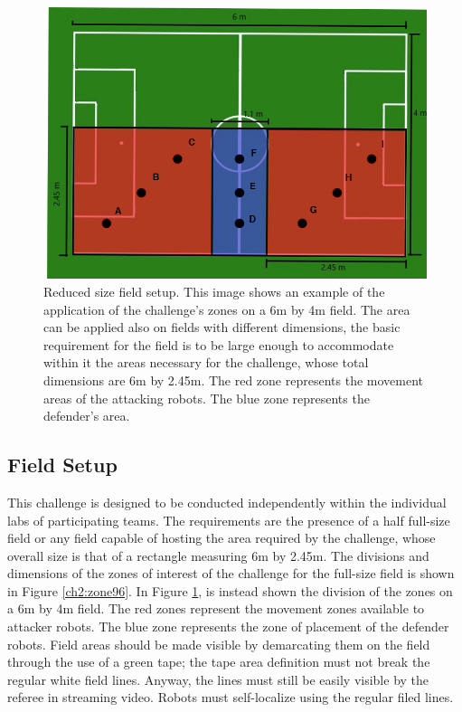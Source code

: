 \begin{figure}[ht]
\includegraphics[width=0.95\linewidth]{figs/ch_2_reduced.jpg}
\caption{Reduced size field setup. This image shows an example of the application of the challenge's zones on a 6m by 4m field. The area can be applied also on fields with different dimensions, the basic requirement for the field is to be large enough to accommodate within it the areas necessary for the challenge, whose total dimensions are 6m by 2.45m. The red zone represents the movement areas of the attacking robots. The blue zone represents the defender's area.}
\label{ch2:zone64}
\centering
\end{figure}


\subsection{Field Setup}
This challenge is designed to be conducted independently within the individual labs of participating teams. The requirements are the presence of a half full-size field or any field capable of hosting the area required by the challenge, whose overall size is that of a rectangle measuring 6m by 2.45m.  
The divisions and dimensions of the zones of interest of the challenge for the full-size field is shown in Figure \ref{ch2:zone96}. In Figure \ref{ch2:zone64}, is instead shown the division of the zones on a 6m by 4m field.
The red zones represent the movement zones available to attacker robots. The blue zone represents the zone of placement of the defender robots.
Field areas should be made visible by demarcating them on the field through the use of a green tape; the tape area definition must not break the regular white field lines. Anyway, the lines must still be easily visible by the referee in streaming video.
Robots must self-localize using the regular filed lines.


